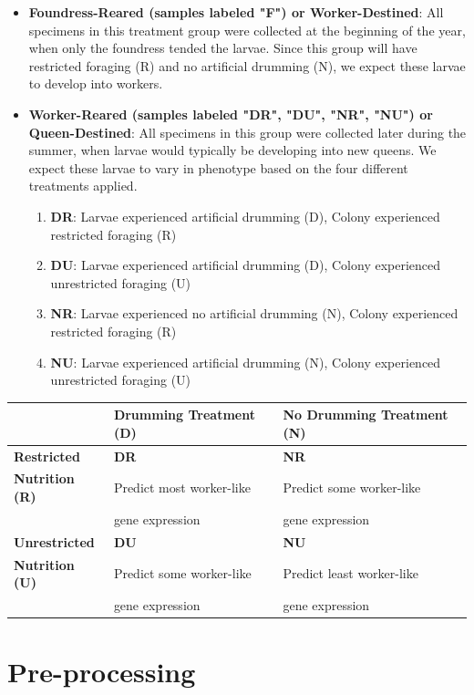 \documentclass[11pt,a4paper,oldfontcommands,openany]{memoir}
\numberwithin{equation}{section} %
\begin{document}
\begin{itemize}
\item \textbf{Foundress-Reared (samples labeled "F") or Worker-Destined}: 
All specimens in this treatment group were collected at the beginning of the year, when only the foundress tended the larvae. Since this group will have restricted foraging (R) and no artificial drumming (N), we expect these larvae to develop into workers.
\item \textbf{Worker-Reared (samples labeled "DR", "DU", "NR", "NU") or Queen-Destined}:
All specimens in this group were collected later during the summer, when larvae would typically be developing into new queens. We expect these larvae to vary in phenotype based on the four different treatments applied.
\begin{enumerate}
\item \textbf{DR}: Larvae experienced artificial drumming (D), Colony experienced restricted foraging (R)
\item \textbf{DU}: Larvae experienced artificial drumming (D), Colony experienced unrestricted foraging (U)
\item \textbf{NR}: Larvae experienced no artificial drumming (N), Colony experienced restricted foraging (R)
\item \textbf{NU}: Larvae experienced artificial drumming (N), Colony experienced unrestricted foraging (U)
\end{enumerate}
\end{itemize}

\begin{tabular}{|p{2.6cm}|p{5.65cm}|p{5.65cm}|}
 \hline
 & \textbf{Drumming Treatment (D)} & \textbf{No Drumming Treatment (N)} \\ 
 \hline
 \textbf{Restricted} & \textbf{DR} & \textbf{NR} \\ 
 \textbf{Nutrition (R)}& Predict most worker-like & Predict some worker-like \\
 & gene expression & gene expression \\
 \hline
 \textbf{Unrestricted} & \textbf{DU} & \textbf{NU} \\ 
 \textbf{Nutrition (U)} & Predict some worker-like & Predict least worker-like \\
 & gene expression & gene expression \\
 \hline
\end{tabular}

\section{Pre-processing}
\end{document}
